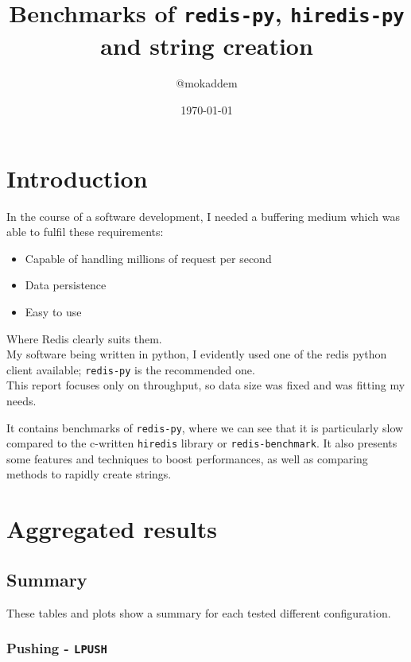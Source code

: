 \documentclass[a4paper, 11pt]{report}
\title{Benchmarks of \texttt{redis-py}, \texttt{hiredis-py} and string creation}
\author{@mokaddem}
\date{\today}
\begin{document}
\maketitle
\tableofcontents
\chapter*{Introduction}
In the course of a software development, I needed a buffering medium which was able to fulfil these requirements:
\begin{itemize}
    \item Capable of handling millions of request per second
    \item Data persistence
    \item Easy to use
\end{itemize}
Where Redis clearly suits them.\\

My software being written in python, I evidently used one of the redis python client available; \texttt{redis-py} is the recommended one.\\

This report focuses only on throughput, so data size was fixed and was fitting my needs.

It contains benchmarks of \texttt{redis-py}, where we can see that it is particularly slow compared to the c-written \texttt{hiredis} library or \texttt{redis-benchmark}. It also presents some features and techniques to boost performances, as well as comparing methods to rapidly create strings.

\chapter{Aggregated results}
\section{Summary}
These tables and plots show a summary for each tested different configuration.
\subsection{Pushing - \texttt{LPUSH}}
\end{document}
